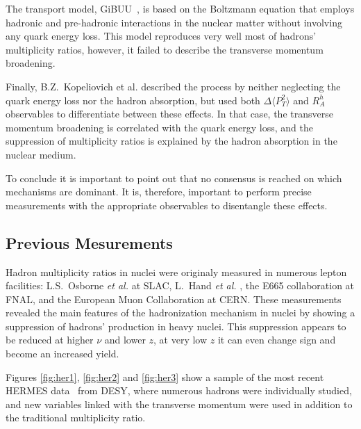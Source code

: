 The transport model, GiBUU~\cite{Gallmeister:2007an}, is based on the 
Boltzmann equation that employs hadronic and pre-hadronic interactions in the nuclear matter without involving any quark energy loss. This model reproduces very well most of hadrons' multiplicity ratios, however, it failed to describe the transverse momentum broadening. 

Finally, B.Z.~Kopeliovich et al. \cite{Kopeliovich:2008uy} described the process by neither neglecting the quark energy loss nor the hadron absorption, but used both $\Delta \langle P_T^2 \rangle$ and $R_A^h$ observables to differentiate between these effects. In that case, the transverse momentum broadening is correlated with the quark energy loss, and the suppression of multiplicity ratios is explained by the hadron absorption in the nuclear medium.

To conclude it is important to point out that no consensus is reached on which 
mechanisms are dominant. It is, therefore, important to perform precise measurements with the appropriate observables to disentangle these effects.


\subsection{Previous Mesurements}
\label{sec:exp}

Hadron multiplicity ratios in nuclei were originaly measured in numerous lepton 
facilities: L.S.~Osborne {\it et al.} \cite{Osborne:1978ai} at SLAC,
L.~Hand {\it et al.} \cite{Hand:1978tx}, the E665 collaboration \cite{Adams:1994ri} at FNAL, and the European Muon Collaboration \cite{Arvidson:1984fz,Ashman:1991cx} at CERN. These measurements revealed the main features of the hadronization mechanism
in nuclei by showing a suppression of hadrons' production in heavy nuclei.
This suppression appears to be reduced at higher $\nu$ and lower $z$, at very 
low $z$ it can even change sign and become an increased yield. 

Figures \ref{fig:her1}, \ref{fig:her2} and \ref{fig:her3} show a sample of 
the most recent HERMES data~\cite{Airapetian:2007vu} from DESY, where numerous hadrons were individually studied, and new variables linked with the transverse momentum were used in addition to the traditional multiplicity ratio.

